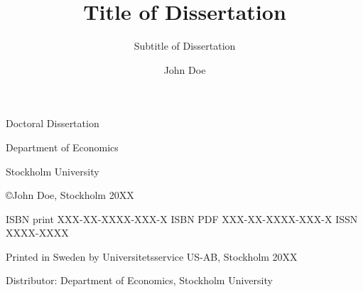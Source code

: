 \documentclass[twoside,11pt]{config/dissertation}
\title{Title of Dissertation}
\subtitle{Subtitle of Dissertation}
\author{John Doe}
\begin{document}
\frontmatterSUecon
{} %
\halftitlepage
\maketitle

\newpage
\noindent Doctoral Dissertation

\noindent Department of Economics

\noindent Stockholm University

\phantom{.}

{\selectfont
{\scriptsize
\noindent
\copyright John Doe, Stockholm 20XX

\vspace{5mm}
\noindent
ISBN print XXX-XX-XXXX-XXX-X\newline %
ISBN PDF XXX-XX-XXXX-XXX-X\newline %
ISSN XXXX-XXXX

\vspace{5mm}
\noindent
Printed in Sweden by Universitetsservice US-AB, Stockholm 20XX %

\noindent
Distributor: Department of Economics, Stockholm University
}
}
\cleardoublepage


\setcounter{page}{1}


\setcounter{secnumdepth}{2}   %
\setcounter{tocdepth}{2}      %
{\sffamily\tableofcontents}   %

\mainmatterSUecon
\setcounter{page}{1}






\backmatterSUecon

\cleardoublepage
\pagestyle{empty}

% 
\end{document}
